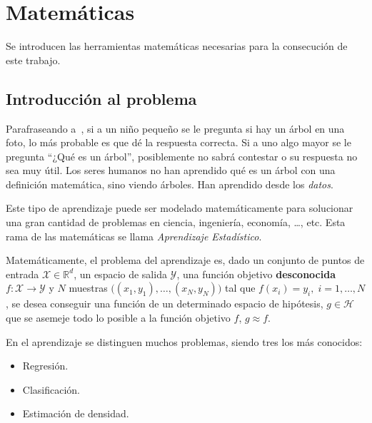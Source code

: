 \documentclass[a4paper,11pt]{book}\usepackage[]{graphicx}\usepackage[]{color}
\theoremstyle{plain}
\theoremstyle{definition}
\begin{document}
\section{Matemáticas}

Se introducen las herramientas matemáticas necesarias para la consecución de este trabajo.



\subsection{Introducción al problema}

Parafraseando a~\cite{Abu-Mostafa:2012:LD:2207825}, si a un niño pequeño se le pregunta si hay un árbol
en una foto, lo más probable es que dé la respuesta correcta. Si a uno algo mayor
se le pregunta ``¿Qué es un árbol'', posiblemente no sabrá contestar o su respuesta
no sea muy útil. Los seres humanos no han aprendido qué es un árbol con una definición
matemática, sino viendo árboles. Han aprendido desde los \emph{datos}.

Este tipo de aprendizaje puede ser modelado matemáticamente para solucionar una gran
cantidad de problemas en ciencia, ingeniería, economía, \ldots, etc. Esta rama de
las matemáticas se llama \emph{Aprendizaje Estadístico}.

Matemáticamente, el problema del aprendizaje es, dado un conjunto de puntos de entrada
$\mathcal{X} \in \mathbb{R}^d$, un espacio de salida $\mathcal{Y}$, una función objetivo
\textbf{desconocida}$f:\mathcal{X} \rightarrow \mathcal{Y}$ y $N$ muestras
$\big((x_1,y_1),\ldots,(x_N,y_N) \big)$
tal que $f(x_i) = y_i, \; i = 1,\ldots,N$,
se desea conseguir una función de un determinado espacio de hipótesis,
$g \in \mathcal{H}$ que se asemeje todo lo posible a la función objetivo
$f$, $g \approx f$.


En el aprendizaje se distinguen muchos problemas, siendo tres los más conocidos:
\begin{itemize}
  \item Regresión.
  \item Clasificación.
  \item Estimación de densidad.
\end{itemize}
\end{document}
